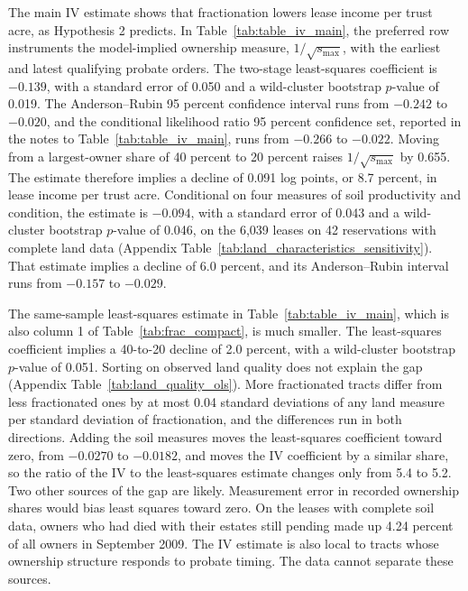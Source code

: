 \documentclass[12pt]{article}
\begin{document}
The main IV estimate shows that fractionation lowers lease income per trust acre, as Hypothesis 2 predicts. In Table~\ref{tab:table_iv_main}, the preferred row instruments the model-implied ownership measure, $1/\sqrt{s_{\max}}$, with the earliest and latest qualifying probate orders. The two-stage least-squares coefficient is $-0.139$, with a standard error of 0.050 and a wild-cluster bootstrap $p$-value of 0.019. The Anderson--Rubin 95 percent confidence interval runs from $-0.242$ to $-0.020$, and the conditional likelihood ratio 95 percent confidence set, reported in the notes to Table~\ref{tab:table_iv_main}, runs from $-0.266$ to $-0.022$. Moving from a largest-owner share of 40 percent to 20 percent raises $1/\sqrt{s_{\max}}$ by 0.655. The estimate therefore implies a decline of 0.091 log points, or 8.7 percent, in lease income per trust acre. Conditional on four measures of soil productivity and condition, the estimate is $-0.094$, with a standard error of 0.043 and a wild-cluster bootstrap $p$-value of 0.046, on the 6,039 leases on 42 reservations with complete land data (Appendix Table~\ref{tab:land_characteristics_sensitivity}). That estimate implies a decline of 6.0 percent, and its Anderson--Rubin interval runs from $-0.157$ to $-0.029$.

The same-sample least-squares estimate in Table~\ref{tab:table_iv_main}, which is also column 1 of Table~\ref{tab:frac_compact}, is much smaller. The least-squares coefficient implies a 40-to-20 decline of 2.0 percent, with a wild-cluster bootstrap $p$-value of 0.051. Sorting on observed land quality does not explain the gap (Appendix Table~\ref{tab:land_quality_ols}). More fractionated tracts differ from less fractionated ones by at most 0.04 standard deviations of any land measure per standard deviation of fractionation, and the differences run in both directions. Adding the soil measures moves the least-squares coefficient toward zero, from $-0.0270$ to $-0.0182$, and moves the IV coefficient by a similar share, so the ratio of the IV to the least-squares estimate changes only from 5.4 to 5.2. Two other sources of the gap are likely. Measurement error in recorded ownership shares would bias least squares toward zero. On the leases with complete soil data, owners who had died with their estates still pending made up 4.24 percent of all owners in September 2009. The IV estimate is also local to tracts whose ownership structure responds to probate timing. The data cannot separate these sources.
\end{document}
